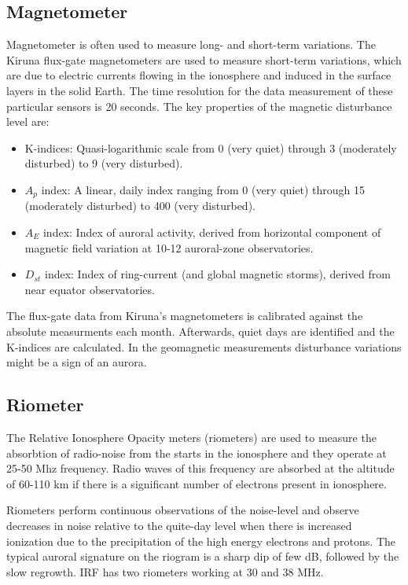 \documentclass{article}
\begin{document}
\subsection{Magnetometer}
Magnetometer is often used to measure long- and short-term variations. The Kiruna flux-gate magnetometers are used to measure short-term variations, which are due to electric currents flowing in the ionosphere and induced in the surface layers in the solid Earth. The time resolution for the data measurement of these particular sensors is 20 seconds. The key properties of the magnetic disturbance level are:

\begin{itemize}
\item K-indices: Quasi-logarithmic scale from 0 (very quiet) through 3 (moderately disturbed) to 9 (very disturbed).
\item $A_p$ index: A linear, daily index ranging from 0 (very quiet) through 15 (moderately disturbed) to 400 (very disturbed).
\item $A_E$ index: Index of auroral activity, derived from horizontal component of magnetic field variation at 10-12 auroral-zone observatories.
\item $D_{st}$ index: Index of ring-current (and global magnetic storms), derived from near equator observatories.
\end{itemize}

The flux-gate data from Kiruna's magnetometers is calibrated against the absolute measurments each month. Afterwards, quiet days are identified and the K-indices are calculated. In the geomagnetic measurements disturbance variations might be a sign of an aurora.

\subsection{Riometer}
The Relative Ionosphere Opacity meters (riometers) are used to measure the absorbtion of radio-noise from the starts in the ionosphere and they operate at 25-50 Mhz frequency. Radio waves of this frequency are absorbed at the altitude of 60-110 km if there is a significant number of electrons present in ionosphere.

Riometers perform continuous observations of the noise-level and observe decreases in noise relative to the quite-day level when there is increased ionization due to the precipitation of the high energy electrons and protons. The typical auroral signature on the riogram is a sharp dip of few dB, followed by the slow regrowth. IRF has two riometers working at 30 and 38 MHz.
\end{document}
